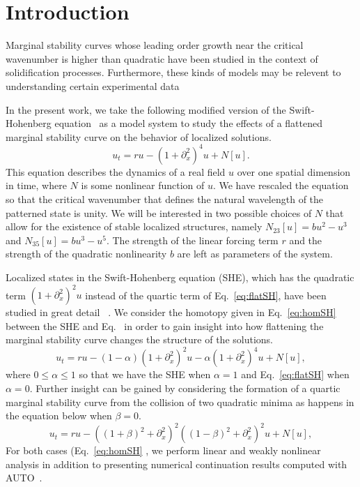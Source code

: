 \documentclass[../main/FlatMarginalStability.tex]{subfiles}
\begin{document}
\section{Introduction}

Marginal stability curves whose leading order growth near the critical wavenumber is higher than quadratic have been studied in the context of solidification processes\cite{proctor1991instabilities,riley1989eckhaus}.  Furthermore, these kinds of models may be relevent to understanding certain experimental data~\cite{}

In the present work, we take the following modified version of the Swift-Hohenberg equation~\cite{} as a model system to study the effects of a flattened marginal stability curve on the behavior of localized solutions.
\begin{equation}
u_t= r u-\left(1+\partial_{x}^2\right)^4 u+N[u]\label{eq:flatSH}.
\end{equation}
This equation describes the dynamics of a real field $u$ over one spatial dimension in time, where $N$ is some nonlinear function of $u$.  We have rescaled the equation so that the critical wavenumber that defines the natural wavelength of the patterned state is unity.  We will be interested in two possible choices of $N$ that allow for the existence of stable localized structures, namely $N_{23}[u]=bu^2-u^3$ and $N_{35}[u]=b u^3-u^5$.  The strength of the linear forcing term $r$ and the strength of the quadratic nonlinearity $b$ are left as parameters of the system.  

Localized states in the Swift-Hohenberg equation (SHE), which has the quadratic term $\left(1+\partial_{x}^2\right)^2u$ instead of the quartic term of Eq.~\ref{eq:flatSH}, have been studied in great detail  ~\cite{}.   We consider the homotopy given in Eq.~\ref{eq:homSH} between the SHE and Eq.~\cite{eq:flatSH} in order to gain insight into how flattening the marginal stability curve changes the structure of the solutions.
\begin{equation}
u_t= r u-(1-\alpha)\left(1+\partial_{x}^2\right)^2 u-\alpha\left(1+\partial_{x}^2\right)^4 u+N[u]\label{eq:homSH},
\end{equation}
where $0\le \alpha \le 1$ so that we have the SHE when $\alpha=1$ and Eq.~\ref{eq:flatSH} when $\alpha=0$.  
Further insight can be gained by considering the formation of a quartic marginal stability curve from the collision of two quadratic minima as happens in the equation below when $\beta=0$.
\begin{equation}
u_t= r u-\left((1+\beta)^2+\partial_{x}^2\right)^2 \left((1-\beta)^2+\partial_{x}^2\right)^2 u+N[u]\label{eq:collSH},
\end{equation}
For both cases (Eq.~\ref{eq:homSH} , we perform linear and weakly nonlinear analysis in addition to presenting numerical continuation results computed with AUTO~\cite{}.     
\end{document}
